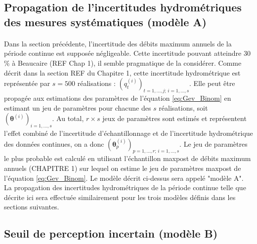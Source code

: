 \documentclass[11pt]{article}
\begin{document}
	

	
	\subsection{Propagation de l'incertitudes hydrométriques des mesures systématiques (modèle A)}
	
	\paragraph{}
	Dans la section précédente, l'incertitude des débits maximum annuels de la période continue est supposée négligeable. Cette incertitude pouvant atteindre 30 \% à Beaucaire (REF Chap 1), il semble pragmatique de la considérer. Comme décrit dans la section REF du Chapitre 1, cette incertitude hydrométrique est représentée par $s = 500$ réalisations : $(q_t^{(i)})_{t=1,...,j;\,i=1,...,s}$. Elle peut être propagée aux estimations des paramètres de l'équation \ref{eq:Gev_Binom} en estimant un jeu de paramètres pour chacune des $s$ réalisations, soit $(\boldsymbol{\theta}
	^{(i)})_{i=1,...,s}$. Au total, $r \times s$ jeux de paramètres sont estimés et représentent l'effet combiné de l'incertitude d'échantillonnage et de l'incertitude hydrométrique des données continues, on a donc $(\boldsymbol{\theta}^{(i)}_p)_{p=1,...,r;\, i=1,...,s}$. Le jeu de paramètres le plus probable est calculé en utilisant l'échantillon maxpost de débits maximum annuels (CHAPITRE 1) sur lequel on estime le jeu de paramètres maxpost de l'équation \ref{eq:Gev_Binom}. Le modèle décrit ci-dessus sera appelé "modèle A". La propagation des incertitudes hydrométriques de la période continue telle que décrite ici sera effectuée similairement pour les trois modèles définis dans les sections suivantes.
	
	\subsection{Seuil de perception incertain (modèle B)}
	
\end{document}
